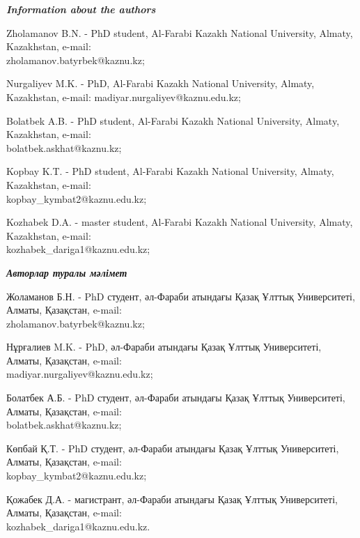 \begin{authorinfo}
\emph{{\bfseries Information about the authors}}

Zholamanov B.N. - PhD student, Al-Farabi Kazakh National
University, Almaty, Kazakhstan, e-mail: \\zholamanov.batyrbek@kaznu.kz;

Nurgaliyev M.K. - PhD, Al-Farabi Kazakh National University, Almaty,
Kazakhstan, e-mail: madiyar.nurgaliyev@kaznu.edu.kz;

Bolatbek A.B. - PhD student, Al-Farabi Kazakh National University,
Almaty, Kazakhstan, e-mail: \\bolatbek.askhat@kaznu.kz;

Kopbay K.T. - PhD student, Al-Farabi Kazakh National University, Almaty,
Kazakhstan, e-mail: \\kopbay\_kymbat2@kaznu.edu.kz;

Kozhabek D.A. - master student, Al-Farabi Kazakh National University,
Almaty, Kazakhstan, e-mail: \\kozhabek\_dariga1@kaznu.edu.kz;

\emph{{\bfseries Авторлар туралы мәлімет}}

Жоламанов Б.Н. - PhD студент, әл-Фараби атындағы Қазақ Ұлттық
Университеті, Алматы, Қазақстан, e-mail: \\zholamanov.batyrbek@kaznu.kz;

Нұрғалиев M.K. - PhD, әл-Фараби атындағы Қазақ Ұлттық Университеті,
Алматы, Қазақстан, e-mail: \\madiyar.nurgaliyev@kaznu.edu.kz;

Болатбек А.Б. - PhD студент, әл-Фараби атындағы Қазақ Ұлттық
Университеті, Алматы, Қазақстан, e-mail: \\bolatbek.askhat@kaznu.kz;

Көпбай Қ.Т. - PhD студент, әл-Фараби атындағы Қазақ Ұлттық Университеті,
Алматы, Қазақстан, e-mail: \\kopbay\_kymbat2@kaznu.edu.kz;

Қожабек Д.А. - магистрант, әл-Фараби атындағы Қазақ Ұлттық Университеті,
Алматы, Қазақстан, e-mail: \\kozhabek\_dariga1@kaznu.edu.kz.
\end{authorinfo}
